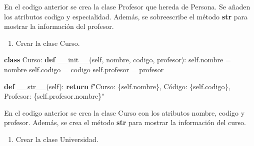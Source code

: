 \documentclass[
  a4paper,
  DIV=11,
  numbers=noendperiod,
  onepage,
  openany]{scrreprt}
\newenvironment{Shaded}{\begin{snugshade}}{\end{snugshade}}
\newcommand{\ControlFlowTok}[1]{\textcolor[rgb]{0.00,0.23,0.31}{\textbf{#1}}}
\newcommand{\FunctionTok}[1]{\textcolor[rgb]{0.28,0.35,0.67}{#1}}
\newcommand{\KeywordTok}[1]{\textcolor[rgb]{0.00,0.23,0.31}{\textbf{#1}}}
\newcommand{\NormalTok}[1]{\textcolor[rgb]{0.00,0.23,0.31}{#1}}
\newcommand{\OperatorTok}[1]{\textcolor[rgb]{0.37,0.37,0.37}{#1}}
\newcommand{\SpecialCharTok}[1]{\textcolor[rgb]{0.37,0.37,0.37}{#1}}
\newcommand{\SpecialStringTok}[1]{\textcolor[rgb]{0.13,0.47,0.30}{#1}}
\newcommand{\VariableTok}[1]{\textcolor[rgb]{0.07,0.07,0.07}{#1}}
\providecommand{\tightlist}{%
  \setlength{\itemsep}{0pt}\setlength{\parskip}{0pt}}\usepackage{longtable,booktabs,array}
\begin{document}
En el codigo anterior se crea la clase Profesor que hereda de Persona.
Se añaden los atributos codigo y especialidad. Además, se sobreescribe
el método \textbf{\textbf{str}} para mostrar la información del
profesor.

\begin{enumerate}
\def\labelenumi{\arabic{enumi}.}
\setcounter{enumi}{3}
\tightlist
\item
  Crear la clase Curso.
\end{enumerate}

\begin{Shaded}
\begin{Highlighting}[]
\KeywordTok{class}\NormalTok{ Curso:}
    \KeywordTok{def} \FunctionTok{\_\_init\_\_}\NormalTok{(}\VariableTok{self}\NormalTok{, nombre, codigo, profesor):}
        \VariableTok{self}\NormalTok{.nombre }\OperatorTok{=}\NormalTok{ nombre}
        \VariableTok{self}\NormalTok{.codigo }\OperatorTok{=}\NormalTok{ codigo}
        \VariableTok{self}\NormalTok{.profesor }\OperatorTok{=}\NormalTok{ profesor}

    \KeywordTok{def} \FunctionTok{\_\_str\_\_}\NormalTok{(}\VariableTok{self}\NormalTok{):}
        \ControlFlowTok{return} \SpecialStringTok{f"Curso: }\SpecialCharTok{\{}\VariableTok{self}\SpecialCharTok{.}\NormalTok{nombre}\SpecialCharTok{\}}\SpecialStringTok{, Código: }\SpecialCharTok{\{}\VariableTok{self}\SpecialCharTok{.}\NormalTok{codigo}\SpecialCharTok{\}}\SpecialStringTok{, Profesor: }\SpecialCharTok{\{}\VariableTok{self}\SpecialCharTok{.}\NormalTok{profesor}\SpecialCharTok{.}\NormalTok{nombre}\SpecialCharTok{\}}\SpecialStringTok{"}
\end{Highlighting}
\end{Shaded}

En el codigo anterior se crea la clase Curso con los atributos nombre,
codigo y profesor. Además, se crea el método \textbf{\textbf{str}} para
mostrar la información del curso.

\begin{enumerate}
\def\labelenumi{\arabic{enumi}.}
\setcounter{enumi}{4}
\tightlist
\item
  Crear la clase Universidad.
\end{enumerate}
\end{document}

